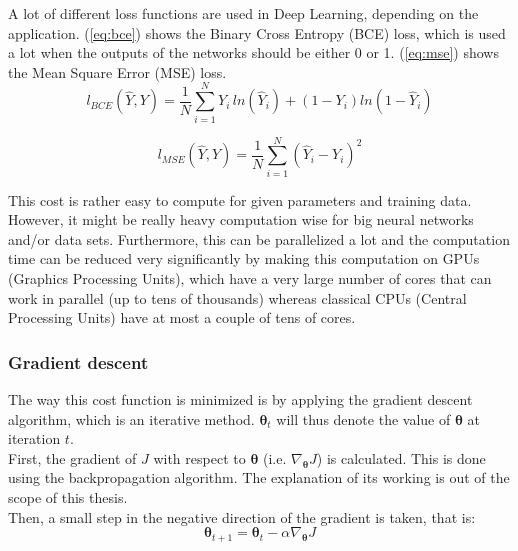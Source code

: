 A lot of different loss functions are used in Deep Learning, depending on the application. (\ref{eq:bce}) shows the Binary Cross Entropy (BCE) loss, which is used a lot when the outputs of the networks should be either 0 or 1. (\ref{eq:mse}) shows the Mean Square Error (MSE) loss. \\


\begin{equation} \label{eq:bce}
    l_{BCE}(\hat{Y},Y) = \frac{1}{N} \sum_{i=1}^N Y_i\, ln(\hat{Y}_i) + (1-Y_i)ln(1-\hat{Y}_i)
\end{equation}

\begin{equation} \label{eq:mse}
    l_{MSE}(\hat{Y},Y) = \frac{1}{N} \sum_{i=1}^N \left(\hat{Y}_i - Y_i \right)^2
\end{equation}

This cost is rather easy to compute for given parameters and training data. However, it might be really heavy computation wise for big neural networks and/or data sets. Furthermore, this can be parallelized a lot and the computation time can be reduced very significantly by making this computation on GPUs (Graphics Processing Units), which have a very large number of cores that can work in parallel (up to tens of thousands) whereas classical CPUs (Central Processing Units) have at most a couple of tens of cores.\\

\subsubsection{Gradient descent}

The way this cost function is minimized is by applying the gradient descent algorithm, which is an iterative method. $\pmb{\theta}_t$ will thus denote the value of $\pmb{\theta}$ at iteration $t$. \\

First, the gradient of $J$ with respect to $\pmb{\theta}$ (i.e. $\nabla_{\pmb{\theta}} J$) is calculated. This is done using the backpropagation algorithm. The explanation of its working is out of the scope of this thesis.\\

Then, a small step in the negative direction of the gradient is taken, that is:
\begin{equation} \label{eq:backprop}
    \pmb{\theta}_{t+1} = \pmb{\theta}_t - \alpha \nabla_{\pmb{\theta}} J
\end{equation}

